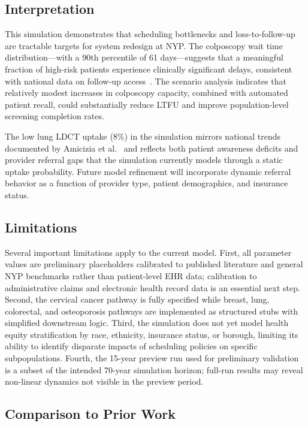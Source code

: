 \documentclass[12pt]{article}
\begin{document}
\subsection{Interpretation}

This simulation demonstrates that scheduling bottlenecks and
loss-to-follow-up are tractable targets for system redesign at NYP.
The colposcopy wait time distribution—with a 90th percentile of 61
days—suggests that a meaningful fraction of high-risk patients
experience clinically significant delays, consistent with national
data on follow-up access~\cite{bonafede2019}.
The scenario analysis indicates that relatively modest increases in
colposcopy capacity, combined with automated patient recall, could
substantially reduce LTFU and improve population-level screening
completion rates.

The low lung LDCT uptake (8\%) in the simulation mirrors national
trends documented by Amicizia et al.~\cite{amicizia2025} and reflects
both patient awareness deficits and provider referral gaps that the
simulation currently models through a static uptake probability.
Future model refinement will incorporate dynamic referral behavior
as a function of provider type, patient demographics, and insurance
status.

\subsection{Limitations}

Several important limitations apply to the current model.
First, all parameter values are preliminary placeholders calibrated to
published literature and general NYP benchmarks rather than
patient-level EHR data; calibration to administrative claims and
electronic health record data is an essential next step.
Second, the cervical cancer pathway is fully specified while breast,
lung, colorectal, and osteoporosis pathways are implemented as
structured stubs with simplified downstream logic.
Third, the simulation does not yet model health equity stratification
by race, ethnicity, insurance status, or borough, limiting its ability
to identify disparate impacts of scheduling policies on specific
subpopulations.
Fourth, the 15-year preview run used for preliminary validation is a
subset of the intended 70-year simulation horizon; full-run results
may reveal non-linear dynamics not visible in the preview period.

\subsection{Comparison to Prior Work}
\end{document}

